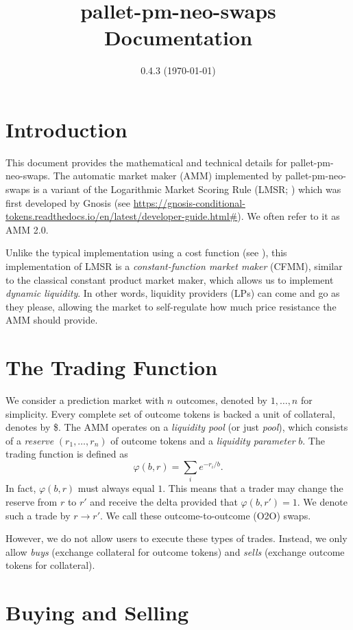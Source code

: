 \documentclass[12pt]{article}
\title{pallet-pm-neo-swaps Documentation}
\date{0.4.3 (\today)}
\begin{document}
\maketitle

\section{Introduction}

This document provides the mathematical and technical details for pallet-pm-neo-swaps. The automatic market maker (AMM) implemented by pallet-pm-neo-swaps is a variant of the Logarithmic Market Scoring Rule (LMSR; \cite{hanson_2003}) which was first developed by Gnosis (see \url{https://gnosis-conditional-tokens.readthedocs.io/en/latest/developer-guide.html#}). We often refer to it as AMM 2.0.

Unlike the typical implementation using a cost function (see \cite{chen_vaughan_2010}), this implementation of LMSR is a \emph{constant-function market maker} (CFMM), similar to the classical constant product market maker, which allows us to implement \emph{dynamic liquidity}. In other words, liquidity providers (LPs) can come and go as they please, allowing the market to self-regulate how much price resistance the AMM should provide.

\section{The Trading Function}

We consider a prediction market with $n$ outcomes, denoted by $1, \ldots, n$ for simplicity. Every complete set of outcome tokens is backed a unit of collateral, denotes by \$. The AMM operates on a \emph{liquidity pool} (or just \emph{pool}), which consists of a \emph{reserve} $(r_1, \ldots, r_n)$ of outcome tokens and a \emph{liquidity parameter} $b$. The trading function is defined as
\[
    \varphi(b, r) = \sum_i e^{-r_i/b}.
\]
In fact, $\varphi(b, r)$ must always equal $1$. This means that a trader may change the reserve from $r$ to $r'$ and receive the delta provided that $\varphi(b, r') = 1$. We denote such a trade by $r \rightarrow r'$. We call these outcome-to-outcome (O2O) swaps.

However, we do not allow users to execute these types of trades. Instead, we only allow \emph{buys} (exchange collateral for outcome tokens) and \emph{sells} (exchange outcome tokens for collateral).

\section{Buying and Selling}
\end{document}
